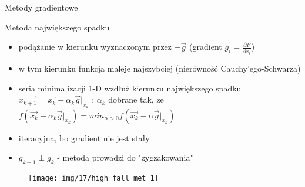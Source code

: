   \begin{frame}{Metody gradientowe}

    \begin{block}{Metoda największego spadku}
    \begin{itemize}
        \item podążanie w kierunku wyznaczonym przez  $- \vec g$ (gradient $g_i = \left. \frac{\partial F}{\partial x_i}$)
        \item w tym kierunku funkcja maleje najszybciej (nierówność Cauchy’ego-Schwarza)
        \item seria minimalizacji 1-D wzdłuż kierunku największego spadku $\vec{x_{k+1}}=\vec{x_k}-\alpha_k \vec{g}\vert_{x_k}$ ; $\alpha_k$ dobrane tak, ze $f(\vec{x_k}-\alpha_k \vec{g}\vert_{x_k})=min_{\alpha>0} f(\vec{x_k}-\alpha \vec{g}\vert_{x_k})$
        \item iteracyjna, bo gradient nie jest stały 
 \item $g_{k+1}\perp g_{k}$ - metoda  prowadzi do "zygzakowania"
    \end{itemize}
 \end{block} 
	 \end{frame}
	 \begin{frame}
  	
    \begin{figure}
		\centering
		\texttt{[image: img/17/high\_fall\_met\_1]}
	\end{figure}

  \end{frame}




